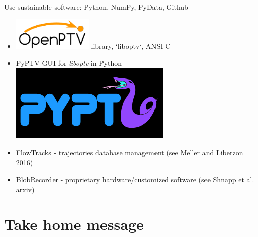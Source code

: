 \documentclass[preprint, aspectratio=43]{beamer}
\begin{document}
\begin{frame}[label=opensource-1]{Use sustainable software: Python, NumPy, PyData, Github}
\begin{itemize}
\item \includegraphics[width=0.3\textwidth]{openptv} \hspace{1em} library, `liboptv`, ANSI C
\item PyPTV GUI for {\em liboptv} in Python \includegraphics[width=.3\textwidth]{pyptv}
\item FlowTracks - trajectories database management (see Meller and Liberzon 2016)
\item BlobRecorder - proprietary hardware/customized software (see Shnapp et al. arxiv)
\end{itemize}
\end{frame}



\section{Take home message}\label{sec:summary}


\end{document}

